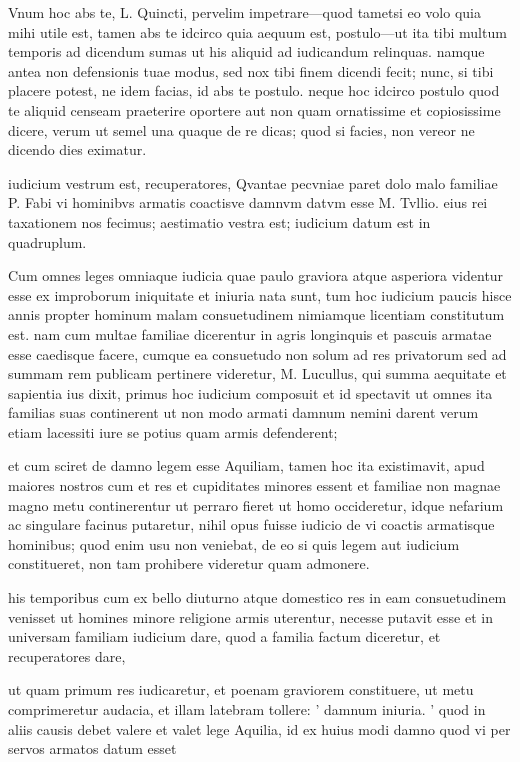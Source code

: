  Vnum hoc abs te, L. Quincti, pervelim impetrare—quod tametsi eo volo quia mihi utile est, tamen abs te idcirco quia aequum est, postulo—ut ita tibi multum temporis ad dicendum sumas ut his aliquid ad iudicandum relinquas. namque antea non defensionis tuae modus, sed nox tibi finem dicendi fecit; nunc, si tibi placere potest, ne idem facias, id abs te postulo. neque hoc idcirco postulo quod te aliquid censeam praeterire oportere aut non quam ornatissime et copiosissime dicere, verum ut semel una quaque de re dicas; quod si facies, non vereor ne dicendo dies eximatur.

 iudicium vestrum est, recuperatores, Qvantae pecvniae paret dolo malo familiae P. Fabi vi hominibvs armatis coactisve damnvm datvm esse M. Tvllio. eius rei taxationem nos fecimus; aestimatio vestra est; iudicium datum est in quadruplum.

 Cum omnes leges omniaque iudicia quae paulo graviora atque asperiora videntur esse ex improborum iniquitate et iniuria nata sunt, tum hoc iudicium paucis hisce annis propter hominum malam consuetudinem nimiamque licentiam constitutum est. nam cum multae familiae dicerentur in agris longinquis et pascuis armatae esse caedisque facere, cumque ea consuetudo non solum ad res privatorum sed ad summam rem publicam pertinere videretur, M. Lucullus, qui summa aequitate et sapientia ius dixit, primus hoc iudicium composuit et id spectavit ut omnes ita familias suas continerent ut non modo armati damnum nemini darent verum etiam lacessiti iure se potius quam armis defenderent;

 et cum sciret de damno legem esse Aquiliam, tamen hoc ita existimavit, apud maiores nostros cum et res et cupiditates minores essent et familiae non magnae magno metu continerentur ut perraro fieret ut homo occideretur, idque nefarium ac singulare facinus putaretur, nihil opus fuisse iudicio de vi coactis armatisque hominibus; quod enim usu non veniebat, de eo si quis legem aut iudicium constitueret, non tam prohibere videretur quam admonere.

 his temporibus cum ex bello diuturno atque domestico res in eam consuetudinem venisset ut homines minore religione armis uterentur, necesse putavit esse et in universam familiam iudicium dare, quod a familia factum diceretur, et recuperatores dare,

 ut quam primum res iudicaretur, et poenam graviorem constituere, ut metu comprimeretur audacia, et illam latebram tollere: ' damnum iniuria. ' quod in aliis causis debet valere et valet lege Aquilia, id ex huius modi damno quod vi per servos armatos datum esset

